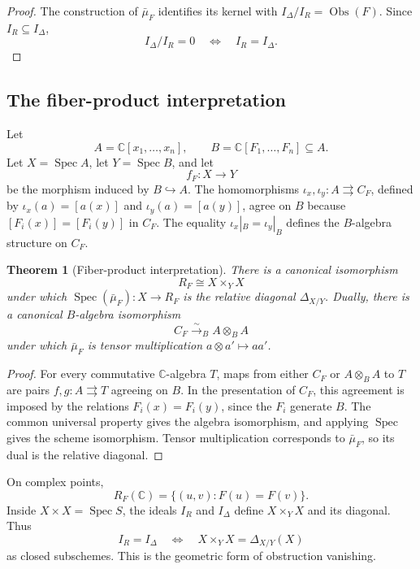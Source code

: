 \documentclass[11pt]{article}
\newtheorem{theorem}{Theorem}[section]
\theoremstyle{remark}
\DeclareMathOperator{\Spec}{Spec}
\newcommand{\C}{\mathbb C}
\newcommand{\Obs}{\operatorname{Obs}}
\begin{document}
\begin{proof}
The construction of \(\bar\mu_F\) identifies its kernel with
\(I_\Delta/I_R=\Obs(F)\).  Since \(I_R\subseteq I_\Delta\),
\[
  I_\Delta/I_R=0
  \quad\Longleftrightarrow\quad
  I_R=I_\Delta.
\]
\end{proof}

\subsection{The fiber-product interpretation}
\label{sec:fiber-product}

Let
\[
  A=\C[x_1,\dots,x_n],\qquad
  B=\C[F_1,\dots,F_n]\subseteq A.
\]
Let \(X=\Spec A\), let \(Y=\Spec B\), and let
\[
  f_F\colon X\longrightarrow Y
\]
be the morphism induced by \(B\hookrightarrow A\).
The homomorphisms
\(\iota_x,\iota_y\colon A\rightrightarrows C_F\), defined by
\(\iota_x(a)=[a(x)]\) and \(\iota_y(a)=[a(y)]\), agree on \(B\) because
\([F_i(x)]=[F_i(y)]\) in \(C_F\).  The equality
\(\iota_x|_B=\iota_y|_B\) defines the \(B\)-algebra structure on \(C_F\).

\begin{theorem}[Fiber-product interpretation]
\label{thm:collision-tensor-product}
There is a canonical isomorphism
\[
  R_F\cong X\times_YX
\]
under which \(\Spec(\bar\mu_F)\colon X\to R_F\) is the relative diagonal
\(\Delta_{X/Y}\).  Dually, there is a canonical \(B\)-algebra isomorphism
\[
  C_F\xrightarrow{\sim}_B A\otimes_BA
\]
under which \(\bar\mu_F\) is tensor multiplication
\(a\otimes a'\mapsto aa'\).
\end{theorem}

\begin{proof}
For every commutative \(\C\)-algebra \(T\), maps from either \(C_F\) or
\(A\otimes_BA\) to \(T\) are pairs
\(f,g\colon A\rightrightarrows T\) agreeing on \(B\).  In the presentation
of \(C_F\), this agreement is imposed by the relations
\(F_i(x)=F_i(y)\), since the \(F_i\) generate \(B\).  The common universal
property gives the algebra isomorphism, and applying \(\Spec\) gives the
scheme isomorphism.  Tensor multiplication corresponds to
\(\bar\mu_F\), so its dual is the relative diagonal.
\end{proof}

On complex points,
\[
  R_F(\C)=\{(u,v):F(u)=F(v)\}.
\]
Inside \(X\times X=\Spec S\), the ideals \(I_R\) and \(I_\Delta\)
define \(X\times_YX\) and its diagonal.  Thus
\[
  I_R=I_\Delta
  \quad\Longleftrightarrow\quad
  X\times_YX=\Delta_{X/Y}(X)
\]
as closed subschemes.  This is the geometric form of obstruction
vanishing.
\end{document}
